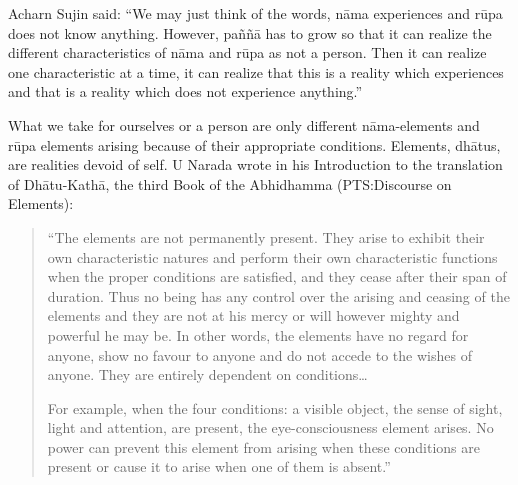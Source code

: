 Acharn Sujin said: ``We may just think of the words, nāma experiences and rūpa does not know anything. However, paññā has to grow so that it can realize the different characteristics of nāma and rūpa as not a person. Then it can realize one characteristic at a time, it can realize that this is a reality which experiences and that is a reality which does not experience anything.''

What we take for ourselves or a person are only different nāma-elements and rūpa elements arising because of their appropriate conditions. Elements, dhātus, are realities devoid of self. U Narada wrote in his Introduction to the translation of Dhātu-Kathā, the third Book of the Abhidhamma (PTS:Discourse on Elements):

\begin{quote}
``The elements are not permanently present. They arise to exhibit their own
characteristic natures and perform their own characteristic functions when
the proper conditions are satisfied, and they cease after their span of
duration. Thus no being has any control over the arising and ceasing of
the elements and they are not at his mercy or will however mighty and
powerful he may be. In other words, the elements have no regard for
anyone, show no favour to anyone and do not accede to the wishes of
anyone. They are entirely dependent on conditions\ldots

For example, when the four conditions: a visible object, the sense of
sight, light and attention, are present, the eye-consciousness element
arises. No power can prevent this element from arising when these
conditions are present or cause it to arise when one of them is absent.''
\end{quote}

